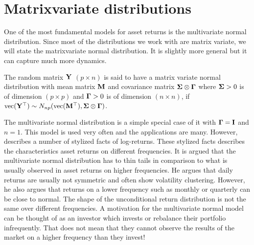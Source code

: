 \documentclass[oneside]{book}\usepackage{knitr}
\begin{document}
\section{Matrixvariate distributions}
One of the most fundamental models for asset returns is the multivariate normal distribution. 
Since most of the distributions we work with are matrix variate, we will state the matrixvariate normal distribution. 
It is slightly more general but it can capture much more dynamics.
\begin{definition}\label{def:matrixnormal}
	The random matrix $\mathbf{Y}$ $(p \times n)$ is said to have a matrix variate normal distribution with mean matrix $\mathbf{M}$ and covariance matrix $\mathbf{\Sigma} \otimes \boldsymbol{\Gamma}$ where $\mathbf{\Sigma} > 0$ is of dimension $(p \times p)$ and $\boldsymbol{\Gamma} >0$ is of dimension $(n \times n)$, if $\operatorname{vec}(\mathbf{Y}^\top) \sim N_{np}(\operatorname{vec}(\mathbf{M}^\top), \mathbf{\Sigma} \otimes \boldsymbol{\Gamma})$.
\end{definition}
The multivariate normal distribution is a simple special case of it with $\boldsymbol{\Gamma} = \mathbf{I}$ and $n=1$.
This model is used very often and the applications are many. 
However, \citet{cont2001empirical} describes a number of stylized facts of log-returns. 
These stylized facts describes the characteristics asset returns on different frequencies.  
It is argued that the multivariate normal distribution has to thin tails in comparison to what is usually observed in asset returns on higher frequencies.
He argues that daily returns are usually not symmetric and often show volatility clustering.  
However, he also argues that returns on a lower frequency such as monthly or quarterly can be close to normal.
The shape of the unconditional return distribution is not the same over different frequencies. 
A motivation for the multivariate normal model can be thought of as an investor which invests or rebalance their portfolio infrequently.
That does not mean that they cannot observe the results of the market on a higher frequency than they invest!
\end{document}
